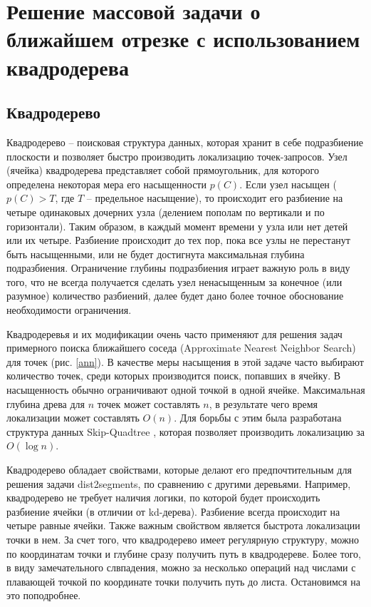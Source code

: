 \chapter{Решение массовой задачи о ближайшем отрезке с использованием квадродерева}
\section{Квадродерево}
Квадродерево -- поисковая структура данных, которая хранит в себе
подразбиение плоскости и позволяет быстро производить локализацию
точек-запросов. Узел (ячейка) квадродерева представляет собой прямоугольник, для
которого определена некоторая мера его насыщенности $p(C)$. Если узел
насыщен ($p(C) > T$, где $T$ -- предельное насыщение), то происходит его
разбиение на четыре одинаковых дочерних узла (делением пополам по
вертикали и по горизонтали). Таким образом, в каждый момент времени у узла
или нет детей или их четыре. Разбиение происходит до тех пор, пока все узлы
не перестанут быть насыщенными, или не будет достигнута максимальная
глубина подразбиения. Ограничение глубины подразбиения играет важную
роль в виду того, что не всегда получается сделать узел ненасыщенным за
конечное (или разумное) количество разбиений, далее будет дано более 
точное обоснование необходимости ограничения.

Квадродеревья и их модификации очень часто применяют для решения
задач примерного поиска ближайшего соседа (Approximate Nearest Neighbor
Search) для точек \cite{FANN} (рис. \ref{ann}). В качестве меры насыщения в этой задаче часто
выбирают количество точек, среди которых производится поиск, попавших в
ячейку. В насыщенность обычно ограничивают одной точкой в одной ячейке.
Максимальная глубина древа для $n$ точек может составлять $n$, в результате чего
время локализации может составлять $O(n)$. Для борьбы с этим была разработана
структура данных Skip-Quadtree \cite{SQT}, которая позволяет производить локализацию за $O(\log n)$.


Квадродерево обладает свойствами, которые делают его предпочтительным
для решения задачи dist2segments, по сравнению с другими деревьями.
Например, квадродерево не требует наличия логики, по которой будет происходить
разбиение ячейки (в отличии от kd-дерева). Разбиение всегда происходит на четыре
равные ячейки. Также важным свойством является быстрота локализации точки в нем.
За счет того, что квадродерево имеет регулярную структуру, можно по координатам точки
и глубине сразу получить путь в квадродереве. Более того, в виду замечательного
слвпадения, можно за несколько операций над числами с плавающей точкой по координате точки получить путь
до листа. Остановимся на это поподробнее.

